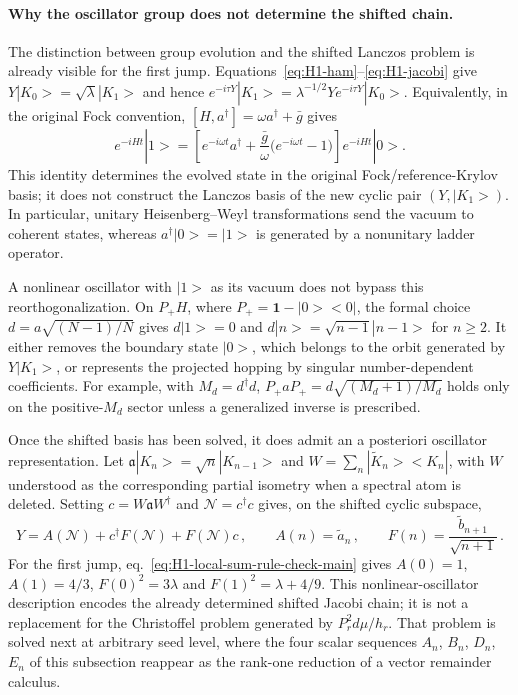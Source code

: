 \documentclass[a4paper,11pt]{article}
\def\ket#1{|#1>}%
\def\bra#1{<#1|}%
\def\dd{d}%
\def\ii{i}%
\def\ee{e}%
\def\cH{H}%
\theoremstyle{definition}
\theoremstyle{remark}
\newcommand{\ket}[1]{|#1\rangle}
\newcommand{\bra}[1]{\langle #1|}
\newcommand{\dd}{\mathrm d}
\newcommand{\ii}{\mathrm i}
\newcommand{\ee}{\mathrm e}
\newcommand{\cH}{\mathcal H}
\newcommand{\Id}{\mathbf 1}
\begin{document}
\paragraph{Why the oscillator group does not determine the shifted chain.}
The distinction between group evolution and the shifted Lanczos problem is
already visible for the first jump.  Equations~\eqref{eq:H1-ham}--\eqref{eq:H1-jacobi} give
$Y\ket{K_0}=\sqrt\lambda\ket{K_1}$ and hence
$\ee^{-\ii\tau Y}\ket{K_1}
=\lambda^{-1/2}Y\ee^{-\ii\tau Y}\ket{K_0}$.  Equivalently, in the
original Fock convention, $[H,a^\dagger]=\omega a^\dagger+\bar g$ gives
\begin{equation}
   \ee^{-\ii Ht}\ket{1}
   =
   \left[
      \ee^{-\ii\omega t}a^\dagger
      +\frac{\bar g}{\omega}
       \bigl(\ee^{-\ii\omega t}-1\bigr)
   \right]\ee^{-\ii Ht}\ket{0}.
   \label{eq:H1-excited-Fock-evolution-app}
\end{equation}
This identity determines the evolved state in the original
Fock/reference-Krylov basis; it does not construct the Lanczos basis of
the new cyclic pair $(Y,\ket{K_1})$.  In particular, unitary
Heisenberg--Weyl transformations send the vacuum to coherent states,
whereas $a^\dagger\ket0=\ket1$ is generated by a nonunitary ladder
operator.

A nonlinear oscillator with $\ket1$ as its vacuum does not bypass this
reorthogonalization.  On $P_+\cH$, where
$P_+=\Id-\ket0\bra0$, the formal choice
$d=a\sqrt{(N-1)/N}$ gives $d\ket1=0$ and
$d\ket n=\sqrt{n-1}\ket{n-1}$ for $n\ge2$.  It either removes the
boundary state $\ket0$, which belongs to the orbit generated by
$Y\ket{K_1}$, or represents the projected hopping by singular
number-dependent coefficients.  For example, with $M_d=d^\dagger d$,
$P_+aP_+=d\sqrt{(M_d+1)/M_d}$ holds only on the positive-$M_d$ sector
unless a generalized inverse is prescribed.

Once the shifted basis has been solved, it does admit an a posteriori
oscillator representation.  Let
$\mathfrak a\ket{K_n}=\sqrt n\ket{K_{n-1}}$ and
$W=\sum_n\ket{\widetilde K_n}\bra{K_n}$, with $W$ understood as the
corresponding partial isometry when a spectral atom is deleted.  Setting
$c=W\mathfrak a W^\dagger$ and $\mathcal N=c^\dagger c$ gives, on the
shifted cyclic subspace,
\begin{equation}
   Y=A(\mathcal N)+c^\dagger F(\mathcal N)+F(\mathcal N)c\,,
   \qquad
   A(n)=\widetilde a_n\,,\qquad
   F(n)=\frac{\widetilde b_{n+1}}{\sqrt{n+1}}\,.
   \label{eq:H1-aposteriori-oscillator-app}
\end{equation}
For the first jump, eq.~\eqref{eq:H1-local-sum-rule-check-main} gives
$A(0)=1$, $A(1)=4/3$, $F(0)^2=3\lambda$ and
$F(1)^2=\lambda+4/9$.  This nonlinear-oscillator description encodes
the already determined shifted Jacobi chain; it is not a replacement
for the Christoffel problem generated by $P_r^2\dd\mu/h_r$. That problem is solved next at
arbitrary seed level, where the four scalar sequences $A_n$, $B_n$, $D_n$, $E_n$ of this
subsection reappear as the rank-one reduction of a vector remainder calculus.
\end{document}
